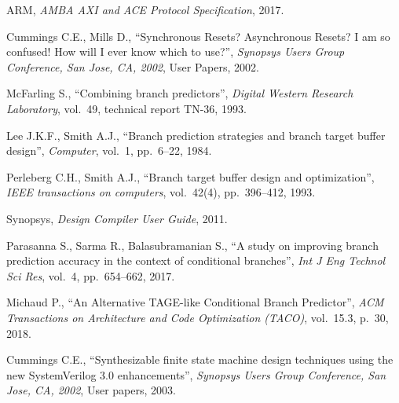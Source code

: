\begin{thebibliography}{99}
    ARM, 
    \textit{AMBA AXI and ACE Protocol Specification},
    2017.

    Cummings C.E., Mills D.,
    ``Synchronous Resets? Asynchronous Resets? I am so confused! How will I ever know which to use?'',  
    \textit{Synopsys Users Group Conference, San Jose, CA, 2002},
    User Papers, 
    2002.

    McFarling S.,
    ``Combining branch predictors'',  
    \textit{Digital Western Research Laboratory},
    vol.~49, technical report TN-36, 
    1993.

    Lee J.K.F., Smith A.J.,
    ``Branch prediction strategies and branch target buffer design'',  
    \textit{Computer},
    vol.~1, pp.~6--22, 
    1984.

    Perleberg C.H., Smith A.J.,
    ``Branch target buffer design and optimization'',  
    \textit{IEEE transactions on computers},
    vol.~42(4), pp.~396--412, 
    1993.

    Synopsys, 
    \textit{Design Compiler User Guide},
    2011.

    Parasanna S., Sarma R., Balasubramanian S.,
    ``A study on improving branch prediction accuracy in the context of conditional branches'',  
    \textit{Int J Eng Technol Sci Res},
    vol.~4, pp.~654--662, 
    2017.

    Michaud P.,
    ``An Alternative TAGE-like Conditional Branch Predictor'',  
    \textit{ACM Transactions on Architecture and Code Optimization (TACO)},
    vol.~15.3, p.~30, 
    2018.

    Cummings C.E.,
    ``Synthesizable finite state machine design techniques using the new SystemVerilog 3.0 enhancements'',  
    \textit{Synopsys Users Group Conference, San Jose, CA, 2002},
    User papers, 
    2003.

\end{thebibliography}